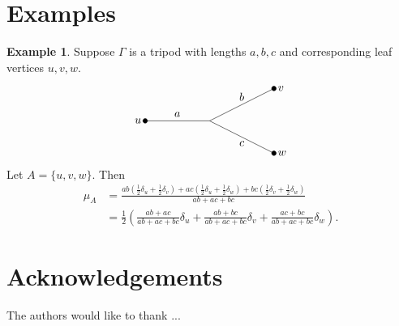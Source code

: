 \documentclass{amsart}
\theoremstyle{definition}
\newtheorem{eg}[thm]{Example}
\begin{document}
\section{Examples}
\begin{eg}
Suppose $\Gamma$ is a tripod with lengths $a,b,c$ and corresponding leaf vertices $u,v,w$.
\[
\begin{tikzpicture}
	\draw (0,0) -- (-2,0);
	\draw (2,1) -- (0,0) -- (2,-1);
	\filldraw[black] (-2,0) circle (2pt);
	\filldraw[black] (2,1) circle (2pt);
	\filldraw[black] (2,-1) circle (2pt);

	\node[above] at (-1,0) {$a$};
	\node[above] at (1,0.5) {$b$};
	\node[below] at (1,-0.5) {$c$};

	\node[left] at (-2,0) {$u$};
	\node[right] at (2,1) {$v$};
	\node[right] at (2,-1) {$w$};
\end{tikzpicture}
\]
Let $A = \{u,v,w\}$.
Then 
\begin{align*}
\mu_A &= \frac{ab(\frac12\delta_u + \frac12\delta_v) + ac(\frac12\delta_u + \frac12\delta_w) + bc(\frac12\delta_v + \frac12\delta_w) }{ab + ac + bc} \\
&= \frac12 \left( \frac{ab + ac}{ab + ac + bc}\delta_u + \frac{ab + bc}{ab + ac + bc} \delta_v + \frac{ac + bc}{ab + ac + bc} \delta_w \right) .
\end{align*}
\end{eg}


\section*{Acknowledgements}
The authors would like to thank ...


 

\end{document}
